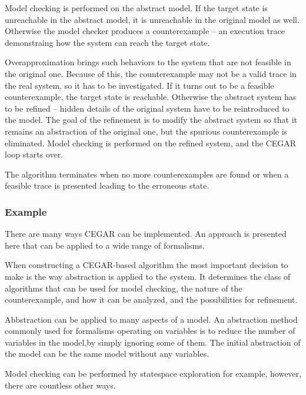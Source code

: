 Model checking is performed on the abstract model. If the target state is
unreachable in the abstract model, it is unreachable in the original model
as well. Otherwise the model checker produces a counterexample -- an execution trace demonstraing how the
system can reach the target state. 

Overapproximation brings such behaviors to the system that are not feasible in the original one. Because of this, the counterexample may not be a valid trace in the real system, so it has to be investigated.
If it turns out to be a feasible counterexample, the target state is reachable. Otherwise
the abstract system has to be refined -- hidden details of the original system have to be reintroduced to the model. The goal of the refinement is to modify the abstract
system so that it remains an abstraction of the original one, but the spurious
counterexample is eliminated.  Model checking is performed on the
refined system, and the CEGAR loop starts over. 

The algorithm terminates when no more
counterexamples are found or when a feasible trace is
presented leading to the erroneous state.

\subsubsection{Example} \label{sec:cegarex}

There are many ways CEGAR can be implemented. An approach is presented here that can be applied to a wide range of formalisms.

When constructing a CEGAR-based algorithm the most important decision to make is the way abstraction is applied to the system. It determines the class of algorithms that can be used for model checking, the nature of the counterexample, and how it can be analyzed, and the possibilities for refinement. 

 Abbstraction can be applied to many aspects of a model. An abstraction method commonly used for formalisms operating on variables is to reduce the number of variables in the model,by simply ignoring some of them. The initial abstraction of the model can be the same model without any variables.
 
 \begin{example}
 \end{example}

Model checking can be performed by statespace exploration for example, however, there are countless other ways.

